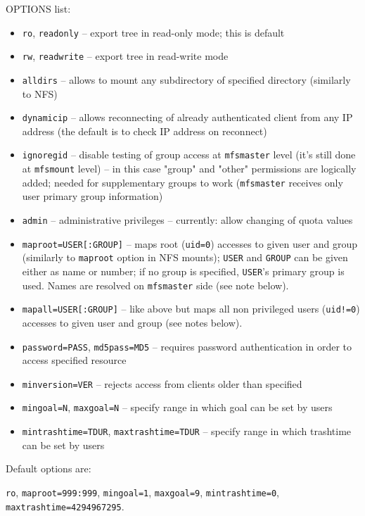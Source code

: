 \documentclass[a4paper,11pt,english]{report}
\def\code#1{\texttt{#1}}
\begin{document}
				\bigskip
				OPTIONS list:
				\begin{itemize}
					\item \code{ro}, \code{readonly} -- export tree in read-only mode; this is default
					\item \code{rw}, \code{readwrite} -- export tree in read-write mode
					\item \code{alldirs} -- allows  to  mount any subdirectory of specified directory (similarly to NFS)
					\item \code{dynamicip} -- allows reconnecting of already authenticated client from any  IP address (the default is to check IP address on reconnect)
					\item \code{ignoregid} -- disable  testing  of group access at \code{mfsmaster} level (it's still
						done at \code{mfsmount} level) -- in this case "group" and "other"
						permissions are logically added; needed for supplementary groups to
						work (\code{mfsmaster} receives only user primary group information)
					\item \code{admin} -- administrative privileges -- currently: allow changing of quota values
					\item \code{maproot=USER[:GROUP]} -- maps root (\code{uid=0}) accesses to given user and group (similarly to \code{maproot}  option  in  NFS  mounts);  \code{USER}  and \code{GROUP} can be given either as name or number; if no group is specified, \code{USER}'s  primary group  is  used. Names are resolved on \code{mfsmaster} side (see note below).
					\item \code{mapall=USER[:GROUP]} -- like above but maps all non privileged users  (\code{uid!=0})  accesses to given user and group (see notes below).
					\item \code{password=PASS}, \code{md5pass=MD5} -- requires  password  authentication  in order to access specified resource
					\item \code{minversion=VER} -- rejects access from clients older than specified
					\item \code{mingoal=N}, \code{maxgoal=N} -- specify range in which goal can be set by users
					\item \code{mintrashtime=TDUR}, \code{maxtrashtime=TDUR} -- specify range in which trashtime can be set by users
				\end{itemize}
				\bigskip
				
				Default  options  are:
				
				\code{ro},  \code{maproot=999:999},   \code{mingoal=1},   \code{maxgoal=9}, \code{mintrashtime=0}, \code{maxtrashtime=4294967295}.
				\bigskip
				
\end{document}
